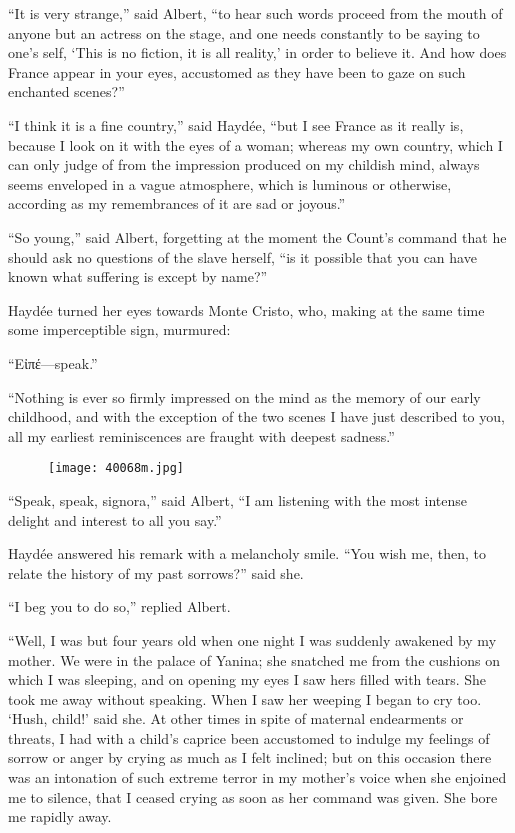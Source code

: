 “It is very strange,” said Albert, “to hear such words proceed from the
mouth of anyone but an actress on the stage, and one needs constantly
to be saying to one’s self, ‘This is no fiction, it is all reality,’ in
order to believe it. And how does France appear in your eyes,
accustomed as they have been to gaze on such enchanted scenes?”

“I think it is a fine country,” said Haydée, “but I see France as it
really is, because I look on it with the eyes of a woman; whereas my
own country, which I can only judge of from the impression produced on
my childish mind, always seems enveloped in a vague atmosphere, which
is luminous or otherwise, according as my remembrances of it are sad or
joyous.”

“So young,” said Albert, forgetting at the moment the Count’s command
that he should ask no questions of the slave herself, “is it possible
that you can have known what suffering is except by name?”

Haydée turned her eyes towards Monte Cristo, who, making at the same
time some imperceptible sign, murmured:

“Εἰπέ—speak.”

“Nothing is ever so firmly impressed on the mind as the memory of our
early childhood, and with the exception of the two scenes I have just
described to you, all my earliest reminiscences are fraught with
deepest sadness.”

\begin{figure}[ht]
\texttt{[image: 40068m.jpg]}
\end{figure}

“Speak, speak, signora,” said Albert, “I am listening with the most
intense delight and interest to all you say.”

Haydée answered his remark with a melancholy smile. “You wish me, then,
to relate the history of my past sorrows?” said she.

“I beg you to do so,” replied Albert.

“Well, I was but four years old when one night I was suddenly awakened
by my mother. We were in the palace of Yanina; she snatched me from the
cushions on which I was sleeping, and on opening my eyes I saw hers
filled with tears. She took me away without speaking. When I saw her
weeping I began to cry too. ‘Hush, child!’ said she. At other times in
spite of maternal endearments or threats, I had with a child’s caprice
been accustomed to indulge my feelings of sorrow or anger by crying as
much as I felt inclined; but on this occasion there was an intonation
of such extreme terror in my mother’s voice when she enjoined me to
silence, that I ceased crying as soon as her command was given. She
bore me rapidly away.

